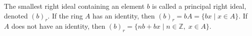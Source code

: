 The smallest right ideal containing an element $b$ is called a principal right ideal, denoted $(b)_r$. If the ring $A$ has an identity, then $(b)_r = bA = \{ bx \mid x \in A \}$. If $A$ does not have an identity, then $(b)_r = \{ nb + bx \mid n \in \mathbb{Z},\; x \in A \}$.